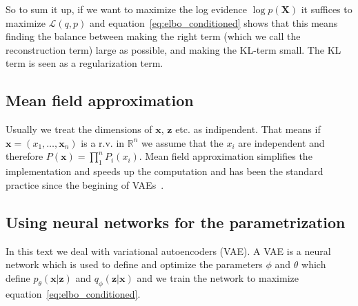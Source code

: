 \documentclass[11pt, a4paper]{report}
\theoremstyle{plain}
\theoremstyle{definition}
\theoremstyle{remark}
\newcommand{\R}{\mathbb{R}}
\newcommand{\X}{\mathbf{X}}
\newcommand{\x}{\mathbf{x}}
\newcommand{\z}{\mathbf{z}}
\begin{document}
So to sum it up, if we want to maximize the log evidence $\log p(\X)$ it
suffices to maximize $\mathcal{L}(q,p)$ and equation~\ref{eq:elbo_conditioned}
shows that this means finding the balance between making 
the right term (which we call the reconstruction term) large as possible, 
and making the KL-term small.
The KL term is seen as a regularization term.

\subsection{Mean field approximation}
Usually we treat the dimensions of $\x$, $\z$ etc. as indipendent.
That means if $\x = (x_1, \dots, \x_n)$ is a r.v. in $\R^n$ 
we assume that the $x_i$ are independent and therefore 
$P(\x) = \prod_1^n P_i(x_i)$.
Mean field approximation simplifies the implementation and speeds up the
computation and has been the standard practice since the
begining of VAEs~\cite{kingma2013auto}.

%

\subsection{Using neural networks for the parametrization}
In this text we deal with variational autoencoders (VAE).
A VAE is a neural network which is used to define and optimize the parameters
$\phi$ and $\theta$ which define $p_{\theta}(\x | \z)$ and $q_{\phi}(\z | \x)$
and we train the network to maximize equation~\ref{eq:elbo_conditioned}.
\end{document}
